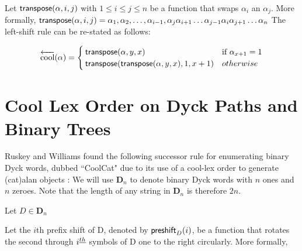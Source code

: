  Let $\mathsf{transpose(} \alpha, i, j \mathsf{)}$ with $1 \le i \le j \le n$ be a function that swaps $\alpha_i$ an $\alpha_j$.  More formally, $\mathsf{transpose(} \alpha, i, j \mathsf{)}=\alpha_1,\alpha_2,\dots,\alpha_{i-1},\alpha_{j}\alpha_{i+1}\dots \alpha_{j-1}\alpha_i \alpha_{j+1}\dots \alpha_n$
The left-shift rule can be re-stated as follows:

\begin{equation*}
    \overleftarrow{\text{cool}}(\alpha) = \begin{cases}
	\mathsf{transpose(} \alpha, y, x \mathsf{)} & \text{if $\alpha_{x+1}=1$}\\
	\mathsf{transpose(} \mathsf{transpose(} \alpha, y, x \mathsf{)}, 1, x+1 \mathsf{)} & otherwise\\
\end{cases}
\end{equation*}





\section{Cool Lex Order on Dyck Paths and Binary Trees}

Ruskey and Williams found the following successor rule for enumerating binary Dyck words, dubbed ``CoolCat" due to its use of a cool-lex order to generate (cat)alan objects \cite{ruskey2008generating}:
We will use $\mathbf{D}_n$ to denote binary Dyck words with $n$ ones and $n$ zeroes.  Note that the length of any string in $\mathbf{D}_n$ is therefore $2n$.

 Let $D \in \mathbf{D}_n$

 Let the $i$th prefix shift of D, denoted by $\mathsf{preshift}_{D}(i \mathsf{)}$, be a function that rotates the second through $i^{\underline{th}}$ symbols of D one to the right circularly.  More formally, 

